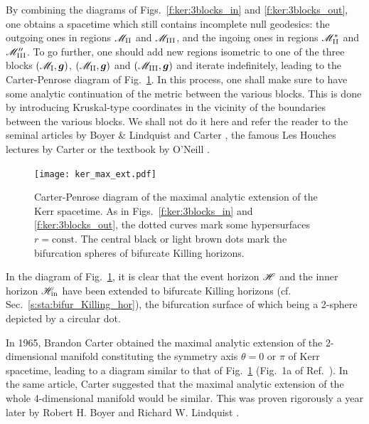 By combining the diagrams of Figs.~\ref{f:ker:3blocks_in} and
\ref{f:ker:3blocks_out}, one obtains a spacetime which still
contains incomplete null geodesics: the outgoing ones in regions
$\mathscr{M}_{\rm II}$ and $\mathscr{M}_{\rm III}$, and the ingoing ones in regions
$\mathscr{M}_{\rm II}^*$ and $\mathscr{M}''_{\rm III}$. To go further, one should add
new regions isometric to one of the three blocks
$(\mathscr{M}_{\rm I},\bm{g})$, $(\mathscr{M}_{\rm II},\bm{g})$ and $(\mathscr{M}_{\rm III},\bm{g})$
and iterate indefinitely, leading to the
Carter-Penrose diagram of Fig.~\ref{f:ker:max_ext}.
In this process, one shall make sure to have some analytic continuation
of the metric between the various blocks. This is done by introducing
Kruskal-type coordinates in the vicinity of the boundaries between
the various blocks. We shall not do it here and refer the reader to
the seminal articles by Boyer \& Lindquist \cite{BoyerL67} and Carter \cite{Carte68},
the famous Les Houches lectures by Carter \cite{Carte73a} or
the textbook by O'Neill \cite{ONeil95}.

\begin{figure}
\centerline{\texttt{[image: ker\_max\_ext.pdf]}}
\caption[]{\label{f:ker:max_ext} \footnotesize
Carter-Penrose diagram of the maximal
analytic extension of the Kerr spacetime. As in Figs.~\ref{f:ker:3blocks_in}
and \ref{f:ker:3blocks_out},
the dotted curves mark some hypersurfaces $r=\mathrm{const}$.
The central black or light brown dots mark the bifurcation spheres of bifurcate Killing horizons.}
\end{figure}

In the diagram of Fig.~\ref{f:ker:max_ext}, it is clear that the event horizon
$\mathscr{H}$ and the inner horizon $\mathscr{H}_{\rm in}$ have been extended to
bifurcate Killing horizons (cf. Sec.~\ref{s:sta:bifur_Killing_hor}), the bifurcation surface of which being a 2-sphere depicted by a circular dot.

\begin{hist}
In 1965, Brandon Carter \cite{Carte66} obtained the maximal analytic extension
of the 2-dimensional manifold constituting the symmetry axis $\theta=0$ or $\pi$ of Kerr spacetime, leading to a diagram similar to that of Fig.~\ref{f:ker:max_ext} (Fig.~1a of Ref.~\cite{Carte66}). In the same article, Carter suggested that the maximal analytic extension of the whole 4-dimensional
manifold would be similar. This was proven rigorously a year later by
Robert H. Boyer and Richard W. Lindquist \cite{BoyerL67}.
\end{hist}

